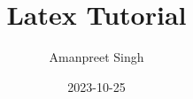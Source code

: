 \usepackage{amsmath} %
\usepackage{graphicx} %
\usepackage{subcaption}
\usepackage{lipsum} %
\usepackage{hyperref} %
\usepackage{booktabs} %
\usepackage{minted} %
\usepackage{enumitem} %

\graphicspath{{../../../../../common/images/stock/}}


\title{Latex Tutorial}
\date{2023-10-25}
\author{Amanpreet Singh}